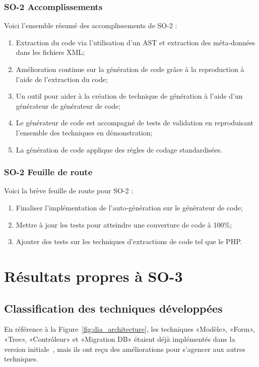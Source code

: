 \subsubsection{SO-2 Accomplissements}
Voici l'ensemble résumé des accomplissements de SO-2 :
\begin{enumerate}
    \item Extraction du code via l’utilisation d’un AST et extraction des méta-données dans les fichiers XML;
    \item Amélioration continue sur la génération de code grâce à la reproduction à l’aide de l’extraction du code;
    \item Un outil pour aider à la création de technique de génération à l’aide d’un générateur de générateur de code;
    \item Le générateur de code est accompagné de tests de validation en reproduisant l’ensemble des techniques en démonstration;
    \item La génération de code applique des règles de codage standardisées.
\end{enumerate}

\subsubsection{SO-2 Feuille de route}
Voici la brève feuille de route pour SO-2 :
\begin{enumerate}
    \item Finaliser l’implémentation de l'auto-génération sur le générateur de code;
    \item Mettre à jour les tests pour atteindre une couverture de code à 100\%;
    \item Ajouter des tests sur les techniques d’extractions de code tel que le PHP.
\end{enumerate}

\section{Résultats propres à SO-3}

\subsection{Classification des techniques développées}\label{result_technique_developpe}

En référence à la Figure~\ref{fig:dia_architecture}, les techniques «Modèle», «Form», «Tree», «Contrôleur» et «Migration DB» étaient déjà implémentés dans la version initiale~\cite{bluiksnot_repo}, mais ils ont reçu des améliorations pour s’agencer aux autres techniques.

